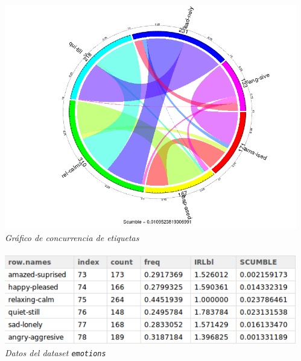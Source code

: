 \documentclass[8pt]{beamer}
\begin{document}
\begin{frame}
\begin{columns}[T]
\begin{column}{.5\textwidth}
		\end{column}
		\begin{column}{.5\textwidth}
			\begin{center}
				\includegraphics[width=.9\textwidth]{imgs/emotions-concurrence}
				\\ \centering \textit{Gráfico de concurrencia de etiquetas}
				\\~\\
				\includegraphics[width=.9\textwidth]{imgs/emotions-dataset}
				\\ \centering \textit{Datos del dataset \texttt{emotions}}
			\end{center}
		\end{column}
	\end{columns}
  \end{frame}


\end{document}
